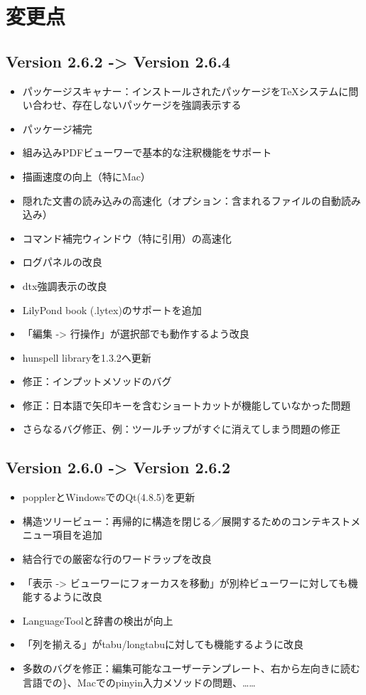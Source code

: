 \chapter{変更点}

\section{Version 2.6.2 -\textgreater{} Version 2.6.4}

\begin{itemize}
\item
  パッケージスキャナー：インストールされたパッケージをTeXシステムに問い合わせ、存在しないパッケージを強調表示する
\item
  パッケージ補完
\item
  組み込みPDFビューワーで基本的な注釈機能をサポート
\item
  描画速度の向上（特にMac）
\item
  隠れた文書の読み込みの高速化（オプション：含まれるファイルの自動読み込み）
\item
  コマンド補完ウィンドウ（特に引用）の高速化
\item
  ログパネルの改良
\item
  dtx強調表示の改良
\item
  LilyPond book (.lytex)のサポートを追加
\item
  「編集 -\textgreater{} 行操作」が選択部でも動作するよう改良
\item
  hunspell libraryを1.3.2へ更新
\item
  修正：インプットメソッドのバグ
\item
  修正：日本語で矢印キーを含むショートカットが機能していなかった問題
\item
  さらなるバグ修正、例：ツールチップがすぐに消えてしまう問題の修正
\end{itemize}

\section{Version 2.6.0 -\textgreater{} Version 2.6.2}

\begin{itemize}
\item
  popplerとWindowsでのQt(4.8.5)を更新
\item
  構造ツリービュー：再帰的に構造を閉じる／展開するためのコンテキストメニュー項目を追加
\item
  結合行での厳密な行のワードラップを改良
\item
  「表示 -\textgreater{}
  ビューワーにフォーカスを移動」が別枠ビューワーに対しても機能するように改良
\item
  LanguageToolと辞書の検出が向上
\item
  「列を揃える」がtabu/longtabuに対しても機能するように改良
\item
  多数のバグを修正：編集可能なユーザーテンプレート、右から左向きに読む言語での\}、Macでのpinyin入力メソッドの問題、……
\end{itemize}

